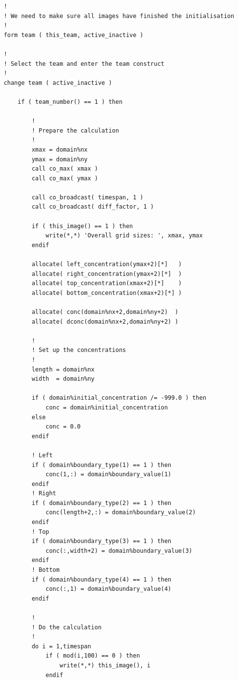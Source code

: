 \documentclass[onecolumn]{article}
\begin{document}
\begin{small}
\begin{verbatim}
    !
    ! We need to make sure all images have finished the initialisation
    !
    form team ( this_team, active_inactive )

    !
    ! Select the team and enter the team construct
    !
    change team ( active_inactive )

        if ( team_number() == 1 ) then

            !
            ! Prepare the calculation
            !
            xmax = domain%nx
            ymax = domain%ny
            call co_max( xmax )
            call co_max( ymax )

            call co_broadcast( timespan, 1 )
            call co_broadcast( diff_factor, 1 )

            if ( this_image() == 1 ) then
                write(*,*) 'Overall grid sizes: ', xmax, ymax
            endif

            allocate( left_concentration(ymax+2)[*]   )
            allocate( right_concentration(ymax+2)[*]  )
            allocate( top_concentration(xmax+2)[*]    )
            allocate( bottom_concentration(xmax+2)[*] )

            allocate( conc(domain%nx+2,domain%ny+2)  )
            allocate( dconc(domain%nx+2,domain%ny+2) )

            !
            ! Set up the concentrations
            !
            length = domain%nx
            width  = domain%ny

            if ( domain%initial_concentration /= -999.0 ) then
                conc = domain%initial_concentration
            else
                conc = 0.0
            endif

            ! Left
            if ( domain%boundary_type(1) == 1 ) then
                conc(1,:) = domain%boundary_value(1)
            endif
            ! Right
            if ( domain%boundary_type(2) == 1 ) then
                conc(length+2,:) = domain%boundary_value(2)
            endif
            ! Top
            if ( domain%boundary_type(3) == 1 ) then
                conc(:,width+2) = domain%boundary_value(3)
            endif
            ! Bottom
            if ( domain%boundary_type(4) == 1 ) then
                conc(:,1) = domain%boundary_value(4)
            endif

            !
            ! Do the calculation
            !
            do i = 1,timespan
                if ( mod(i,100) == 0 ) then
                    write(*,*) this_image(), i
                endif


\end{verbatim}
\end{small}
\end{document}
